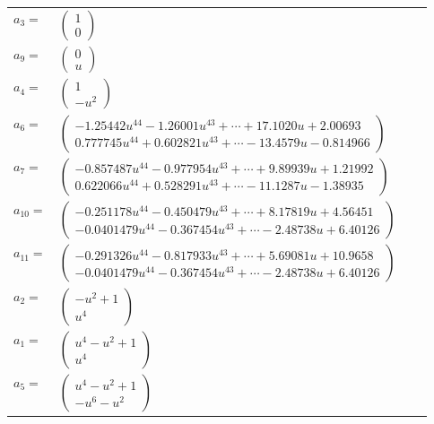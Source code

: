 \documentclass[1p]{elsarticle_modified}
\theoremstyle{definition}
\begin{document}
\begin{tabular}{m{7pt} m{180pt} m{7pt} m{180pt} }
\flushright $a_{3}=$&$\begin{pmatrix}1\\0\end{pmatrix}$ \\
\flushright $a_{9}=$&$\begin{pmatrix}0\\u\end{pmatrix}$ \\
\flushright $a_{4}=$&$\begin{pmatrix}1\\- u^2\end{pmatrix}$ \\
\flushright $a_{6}=$&$\begin{pmatrix}-1.25442 u^{44}-1.26001 u^{43}+\cdots+17.1020 u+2.00693\\0.777745 u^{44}+0.602821 u^{43}+\cdots-13.4579 u-0.814966\end{pmatrix}$ \\
\flushright $a_{7}=$&$\begin{pmatrix}-0.857487 u^{44}-0.977954 u^{43}+\cdots+9.89939 u+1.21992\\0.622066 u^{44}+0.528291 u^{43}+\cdots-11.1287 u-1.38935\end{pmatrix}$ \\
\flushright $a_{10}=$&$\begin{pmatrix}-0.251178 u^{44}-0.450479 u^{43}+\cdots+8.17819 u+4.56451\\-0.0401479 u^{44}-0.367454 u^{43}+\cdots-2.48738 u+6.40126\end{pmatrix}$ \\
\flushright $a_{11}=$&$\begin{pmatrix}-0.291326 u^{44}-0.817933 u^{43}+\cdots+5.69081 u+10.9658\\-0.0401479 u^{44}-0.367454 u^{43}+\cdots-2.48738 u+6.40126\end{pmatrix}$ \\
\flushright $a_{2}=$&$\begin{pmatrix}- u^2+1\\u^4\end{pmatrix}$ \\
\flushright $a_{1}=$&$\begin{pmatrix}u^4- u^2+1\\u^4\end{pmatrix}$ \\
\flushright $a_{5}=$&$\begin{pmatrix}u^4- u^2+1\\- u^6- u^2\end{pmatrix}$ \\

\end{tabular}
\end{document}
